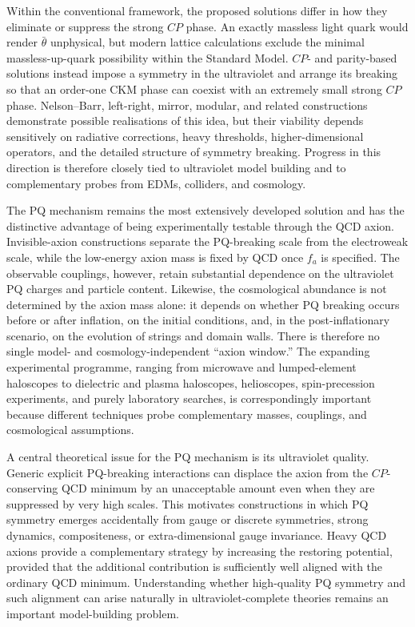 \documentclass[review]{elsarticle}
\numberwithin{equation}{section}
\numberwithin{table}{section}
\numberwithin{figure}{section}
\begin{document}
Within the conventional framework, the proposed solutions differ in how they eliminate or suppress the strong $CP$ phase. An exactly massless light quark would render $\bar\theta$ unphysical, but modern lattice calculations exclude the minimal massless-up-quark possibility within the Standard Model. $CP$- and parity-based solutions instead impose a symmetry in the ultraviolet and arrange its breaking so that an order-one CKM phase can coexist with an extremely small strong $CP$ phase. Nelson--Barr, left-right, mirror, modular, and related constructions demonstrate possible realisations of this idea, but their viability depends sensitively on radiative corrections, heavy thresholds, higher-dimensional operators, and the detailed structure of symmetry breaking. Progress in this direction is therefore closely tied to ultraviolet model building and to complementary probes from EDMs, colliders, and cosmology.

The PQ mechanism remains the most extensively developed solution and has the distinctive advantage of being experimentally testable through the QCD axion. Invisible-axion constructions separate the PQ-breaking scale from the electroweak scale, while the low-energy axion mass is fixed by QCD once $f_a$ is specified. The observable couplings, however, retain substantial dependence on the ultraviolet PQ charges and particle content. Likewise, the cosmological abundance is not determined by the axion mass alone: it depends on whether PQ breaking occurs before or after inflation, on the initial conditions, and, in the post-inflationary scenario, on the evolution of strings and domain walls. There is therefore no single model- and cosmology-independent ``axion window.'' The expanding experimental programme, ranging from microwave and lumped-element haloscopes to dielectric and plasma haloscopes, helioscopes, spin-precession experiments, and purely laboratory searches, is correspondingly important because different techniques probe complementary masses, couplings, and cosmological assumptions.

A central theoretical issue for the PQ mechanism is its ultraviolet quality. Generic explicit PQ-breaking interactions can displace the axion from the $CP$-conserving QCD minimum by an unacceptable amount even when they are suppressed by very high scales. This motivates constructions in which PQ symmetry emerges accidentally from gauge or discrete symmetries, strong dynamics, compositeness, or extra-dimensional gauge invariance. Heavy QCD axions provide a complementary strategy by increasing the restoring potential, provided that the additional contribution is sufficiently well aligned with the ordinary QCD minimum. Understanding whether high-quality PQ symmetry and such alignment can arise naturally in ultraviolet-complete theories remains an important model-building problem.
\end{document}
